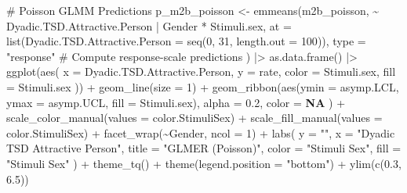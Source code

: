 \documentclass[
  bookmarksnumbered]{article}
\newenvironment{Shaded}{\begin{snugshade}}{\end{snugshade}}
\newcommand{\AttributeTok}[1]{\textcolor[rgb]{0.80,0.80,0.80}{#1}}
\newcommand{\CommentTok}[1]{\textcolor[rgb]{0.50,0.62,0.50}{#1}}
\newcommand{\ConstantTok}[1]{\textcolor[rgb]{0.86,0.64,0.64}{\textbf{#1}}}
\newcommand{\DecValTok}[1]{\textcolor[rgb]{0.86,0.86,0.80}{#1}}
\newcommand{\FloatTok}[1]{\textcolor[rgb]{0.75,0.75,0.82}{#1}}
\newcommand{\FunctionTok}[1]{\textcolor[rgb]{0.94,0.94,0.56}{#1}}
\newcommand{\NormalTok}[1]{\textcolor[rgb]{0.80,0.80,0.80}{#1}}
\newcommand{\OtherTok}[1]{\textcolor[rgb]{0.94,0.94,0.56}{#1}}
\newcommand{\SpecialCharTok}[1]{\textcolor[rgb]{0.86,0.64,0.64}{#1}}
\newcommand{\StringTok}[1]{\textcolor[rgb]{0.80,0.58,0.58}{#1}}
\begin{document}
\begin{Shaded}
\begin{Highlighting}[]
\CommentTok{\# Poisson GLMM Predictions}
\NormalTok{p\_m2b\_poisson }\OtherTok{\textless{}{-}} \FunctionTok{emmeans}\NormalTok{(m2b\_poisson, }\SpecialCharTok{\textasciitilde{}}\NormalTok{ Dyadic.TSD.Attractive.Person }\SpecialCharTok{|}\NormalTok{ Gender }\SpecialCharTok{*}\NormalTok{ Stimuli.sex,}
  \AttributeTok{at =} \FunctionTok{list}\NormalTok{(}\AttributeTok{Dyadic.TSD.Attractive.Person =} \FunctionTok{seq}\NormalTok{(}\DecValTok{0}\NormalTok{, }\DecValTok{31}\NormalTok{, }\AttributeTok{length.out =} \DecValTok{100}\NormalTok{)),}
  \AttributeTok{type =} \StringTok{"response"} \CommentTok{\# Compute response{-}scale predictions}
\NormalTok{) }\SpecialCharTok{|\textgreater{}}
  \FunctionTok{as.data.frame}\NormalTok{() }\SpecialCharTok{|\textgreater{}}
  \FunctionTok{ggplot}\NormalTok{(}\FunctionTok{aes}\NormalTok{(}
    \AttributeTok{x =}\NormalTok{ Dyadic.TSD.Attractive.Person, }\AttributeTok{y =}\NormalTok{ rate,}
    \AttributeTok{color =}\NormalTok{ Stimuli.sex, }\AttributeTok{fill =}\NormalTok{ Stimuli.sex}
\NormalTok{  )) }\SpecialCharTok{+}
  \FunctionTok{geom\_line}\NormalTok{(}\AttributeTok{size =} \DecValTok{1}\NormalTok{) }\SpecialCharTok{+}
  \FunctionTok{geom\_ribbon}\NormalTok{(}\FunctionTok{aes}\NormalTok{(}\AttributeTok{ymin =}\NormalTok{ asymp.LCL, }\AttributeTok{ymax =}\NormalTok{ asymp.UCL, }\AttributeTok{fill =}\NormalTok{ Stimuli.sex),}
    \AttributeTok{alpha =} \FloatTok{0.2}\NormalTok{, }\AttributeTok{color =} \ConstantTok{NA}
\NormalTok{  ) }\SpecialCharTok{+}
  \FunctionTok{scale\_color\_manual}\NormalTok{(}\AttributeTok{values =}\NormalTok{ color.StimuliSex) }\SpecialCharTok{+}
  \FunctionTok{scale\_fill\_manual}\NormalTok{(}\AttributeTok{values =}\NormalTok{ color.StimuliSex) }\SpecialCharTok{+}
  \FunctionTok{facet\_wrap}\NormalTok{(}\SpecialCharTok{\textasciitilde{}}\NormalTok{Gender, }\AttributeTok{ncol =} \DecValTok{1}\NormalTok{) }\SpecialCharTok{+}
  \FunctionTok{labs}\NormalTok{(}
    \AttributeTok{y =} \StringTok{""}\NormalTok{, }\AttributeTok{x =} \StringTok{"Dyadic TSD Attractive Person"}\NormalTok{,}
    \AttributeTok{title =} \StringTok{"GLMER (Poisson)"}\NormalTok{, }\AttributeTok{color =} \StringTok{"Stimuli Sex"}\NormalTok{, }\AttributeTok{fill =} \StringTok{"Stimuli Sex"}
\NormalTok{  ) }\SpecialCharTok{+}
  \FunctionTok{theme\_tq}\NormalTok{() }\SpecialCharTok{+}
  \FunctionTok{theme}\NormalTok{(}\AttributeTok{legend.position =} \StringTok{"bottom"}\NormalTok{) }\SpecialCharTok{+}
  \FunctionTok{ylim}\NormalTok{(}\FunctionTok{c}\NormalTok{(}\FloatTok{0.3}\NormalTok{, }\FloatTok{6.5}\NormalTok{))}


\end{Highlighting}
\end{Shaded}
\end{document}
